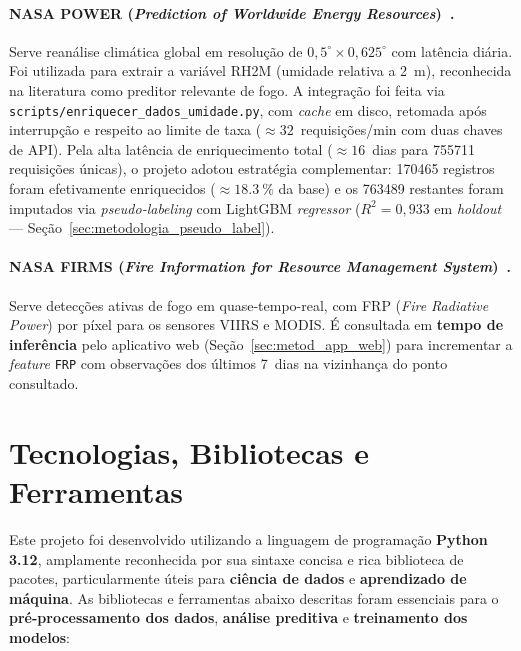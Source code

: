 \paragraph{NASA POWER (\emph{Prediction of Worldwide Energy Resources})~\cite{nasapower}.} Serve reanálise climática global em resolução de \(0{,}5^\circ \times 0{,}625^\circ\) com latência diária. Foi utilizada para extrair a variável RH2M (umidade relativa a 2~m), reconhecida na literatura como preditor relevante de fogo. A integração foi feita via \texttt{scripts/enriquecer\_dados\_umidade.py}, com \emph{cache} em disco, retomada após interrupção e respeito ao limite de taxa (\(\approx 32\)~requisições/min com duas chaves de API). Pela alta latência de enriquecimento total (\(\approx 16\)~dias para \num{755711} requisições únicas), o projeto adotou estratégia complementar: \num{170465} registros foram efetivamente enriquecidos (\(\approx \SI{18,3}{\percent}\) da base) e os \num{763489} restantes foram imputados via \emph{pseudo-labeling} com LightGBM \emph{regressor} (\(R^2 = 0{,}933\) em \emph{holdout} --- Seção~\ref{sec:metodologia_pseudo_label}).

\paragraph{NASA FIRMS (\emph{Fire Information for Resource Management System})~\cite{nasafirms}.} Serve detecções ativas de fogo em quase-tempo-real, com FRP (\emph{Fire Radiative Power}) por píxel para os sensores VIIRS e MODIS. É consultada em \textbf{tempo de inferência} pelo aplicativo web (Seção~\ref{sec:metod_app_web}) para incrementar a \emph{feature} \texttt{FRP} com observações dos últimos 7~dias na vizinhança do ponto consultado.

\section{Tecnologias, Bibliotecas e Ferramentas}

Este projeto foi desenvolvido utilizando a linguagem de programação \textbf{Python 3.12}, amplamente reconhecida por sua sintaxe concisa e rica biblioteca de pacotes, particularmente úteis para \textbf{ciência de dados} e \textbf{aprendizado de máquina}. As bibliotecas e ferramentas abaixo descritas foram essenciais para o \textbf{pré-processamento dos dados}, \textbf{análise preditiva} e \textbf{treinamento dos modelos}:

